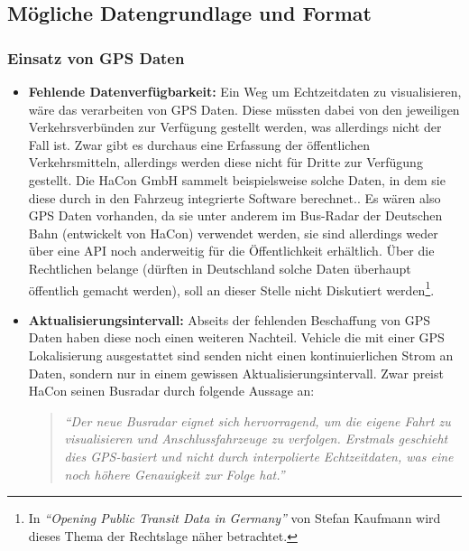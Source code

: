 \subsection{Mögliche Datengrundlage und Format}
\label{sub:mögliche_datengrundlage_und_format}

  \subsubsection{Einsatz von GPS Daten}
  \label{ssub:einsatz_von_gps_daten}

    \begin{itemize}
      \item \textbf{Fehlende Datenverfügbarkeit:}
        Ein Weg um Echtzeitdaten zu visualisieren, wäre das verarbeiten von GPS Daten. Diese müssten dabei von den jeweiligen Verkehrsverbünden zur Verfügung gestellt werden, was allerdings nicht der Fall ist. Zwar gibt es durchaus eine Erfassung der öffentlichen Verkehrsmitteln, allerdings werden diese nicht für Dritte zur Verfügung gestellt. Die HaCon GmbH sammelt beispielsweise solche Daten, in dem sie diese durch in den Fahrzeug integrierte Software berechnet.\parencite{havasBusradar}. Es wären also GPS Daten vorhanden, da sie unter anderem im Bus-Radar der Deutschen Bahn (entwickelt von HaCon) verwendet werden, sie sind allerdings weder über eine API noch anderweitig für die Öffentlichkeit erhältlich. Über die Rechtlichen belange (dürften in Deutschland solche Daten überhaupt öffentlich gemacht werden), soll an dieser Stelle nicht Diskutiert werden\footnote{In \textit{"`Opening Public Transit Data in Germany"'} von Stefan Kaufmann\parencite{kaufmann} wird dieses Thema der Rechtslage näher betrachtet.}.

      \item \textbf{Aktualisierungsintervall:}
        Abseits der fehlenden Beschaffung von GPS Daten haben diese noch einen weiteren Nachteil. Vehicle die mit einer GPS Lokalisierung ausgestattet sind senden nicht einen kontinuierlichen Strom an Daten, sondern nur in einem gewissen Aktualisierungsintervall. Zwar preist HaCon seinen Busradar durch folgende Aussage an: 

        \begin{quote}
          \textit{"`Der neue Busradar eignet sich hervorragend, um die eigene Fahrt zu visualisieren und Anschlussfahrzeuge zu verfolgen. Erstmals geschieht dies GPS-basiert und nicht durch interpolierte Echtzeitdaten, was eine noch höhere Genauigkeit zur Folge hat."'}\parencite{havasBusradar}
        \end{quote}


\end{itemize}
